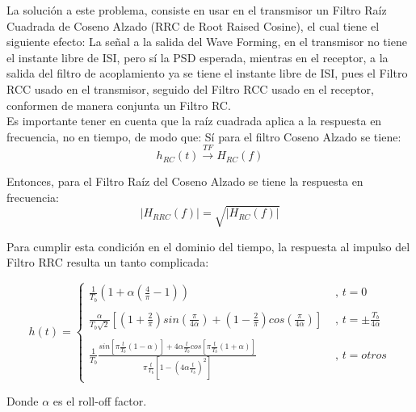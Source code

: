 La solución a este problema, consiste en usar en el transmisor un Filtro Raíz Cuadrada de Coseno Alzado (RRC de Root Raised Cosine), el cual tiene el siguiente efecto: La señal a la salida del Wave Forming, en el transmisor no tiene el instante libre de ISI, pero sí la PSD esperada, mientras en el receptor, a la salida del filtro de acoplamiento ya se tiene el instante libre de ISI, pues el Filtro RCC usado en el transmisor, seguido del Filtro RCC usado en el receptor, conformen de manera conjunta un Filtro RC. \\
Es importante tener en cuenta que la raíz cuadrada aplica a la respuesta en frecuencia, no en tiempo, de modo que:
Sí para el filtro Coseno Alzado se tiene:\\

\begin{equation} \label{capcuatro_veintisiete}
 	h_{RC}(t)\overset{TF}{\rightarrow}H_{RC}(f)
\end{equation}

Entonces, para el Filtro Raíz del Coseno Alzado se tiene la respuesta en frecuencia: \\

\begin{equation} \label{capcuatro_veintiocho}
	|H_{RRC}(f)|= \sqrt{|H_{RC}(f)|}
\end{equation}

Para cumplir esta condición en el dominio del tiempo, la respuesta al impulso del Filtro RRC resulta un tanto complicada: 

\begin{equation} \label{capcuatro_veintinueve}
	h(t)=\begin{cases}
	\frac{1}{T_{b}}(1+\alpha (\frac{4}{\pi}-1)) & \text{ ,   } t=0 \\ \\
	\frac{\alpha}{T_{b}\sqrt{2}}[(1+\frac{2}{\pi})sin(\frac{\pi}{4\alpha})+(1-\frac{2}{\pi})cos(\frac{\pi}{4\alpha})] & \text{ ,   } t= \pm\frac{T_{b}}{4\alpha}\\ \\
	\frac{1}{T_{b}}\frac{sin[\pi\frac{t}{T_b}(1-\alpha)]+4\alpha\frac{t}{T_b}cos[\pi\frac{t}{T_{b}}(1+\alpha)]}{\pi\frac{t}{T_{b}}[1-(4\alpha\frac{t}{T_{b}})^2]} & \text{ ,   } t=otros 
	\end{cases}
\end{equation}

Donde $\alpha$ es el roll-off factor.


